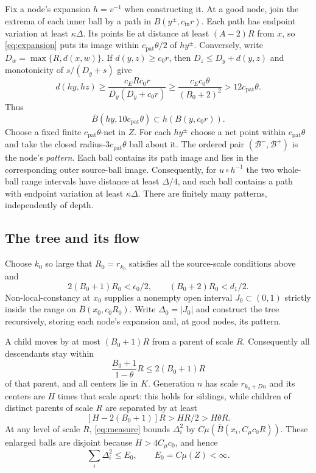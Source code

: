 Fix a node's expansion $h=v^{-1}$ when constructing it. At a good node,
join the extrema of each inner ball by a path in
$B(y^\pm,c_{\mathrm{in}}r)$. Each path has endpoint variation at least
$\kappa\Delta$. Its points lie at distance at least $(A-2)R$ from $x$,
so \eqref{eq:expansion} puts its image within
$c_{\mathrm{pat}}\theta/2$ of $hy^\pm$.
Conversely, write $D_w=\max\{R,d(x,w)\}$. If $d(y,z)\geq c_0r$, then
$D_z\leq D_y+d(y,z)$ and monotonicity of $s/(D_y+s)$ give
\[
 d(hy,hz)\geq\frac{c_ERc_0r}{D_y(D_y+c_0r)}
 \geq\frac{c_Ec_0\theta}{(B_0+2)^2}>12c_{\mathrm{pat}}\theta.
\]
Thus
\begin{equation}
 \overline B(hy,10c_{\mathrm{pat}}\theta)
       \subset h(B(y,c_0r)).
 \label{eq:pattern-containment}
\end{equation}
Choose a fixed finite $c_{\mathrm{pat}}\theta$-net in $Z$. For each
$hy^\pm$ choose a net point within $c_{\mathrm{pat}}\theta$ and take
the closed radius-$3c_{\mathrm{pat}}\theta$ ball about it. The ordered
pair $(\mathcal B^-,\mathcal B^+)$ is the node's \emph{pattern}.
Each ball contains its path image and lies in the corresponding outer
source-ball image. Consequently, for $u\circ h^{-1}$ the two whole-ball
range intervals have distance at least $\Delta/4$, and each ball
contains a path with endpoint variation at least $\kappa\Delta$.
There are finitely many patterns, independently of depth.

\subsection{The tree and its flow}

Choose $k_0$ so large that $R_0=r_{k_0}$ satisfies all the source-scale
conditions above and
\[
 2(B_0+1)R_0<\epsilon_0/2,\qquad (B_0+2)R_0<d_1/2.
\]
Non-local-constancy at $x_0$ supplies a nonempty open interval
$J_0\subset(0,1)$ strictly inside the range on
$\overline B(x_0,c_0R_0)$. Write $\Delta_0=|J_0|$ and construct the
tree recursively, storing each node's expansion and, at good nodes,
its pattern.

A child moves by at most $(B_0+1)R$ from a parent of scale $R$.
Consequently all descendants stay within
\begin{equation}
 \frac{B_0+1}{1-\theta}R\leq2(B_0+1)R
 \label{eq:descendant-displacement}
\end{equation}
of that parent, and all centers lie in $K$. Generation $n$ has scale
$r_{k_0+Dn}$ and its centers are $H$ times that scale apart: this holds
for siblings, while children of distinct parents of scale $R$ are
separated by at least
\[
 [H-2(B_0+1)]R>HR/2>H\theta R.
\]
At any level of scale $R$, \eqref{eq:measure} bounds $\Delta_i^2$ by
$C\mu(\overline B(x_i,C_\mu c_0R))$. These enlarged balls are disjoint
because $H>4C_\mu c_0$, and hence
\begin{equation}
 \sum_i\Delta_i^2\leq E_0,\qquad E_0=C\mu(Z)<\infty.
 \label{eq:level-energy}
\end{equation}

